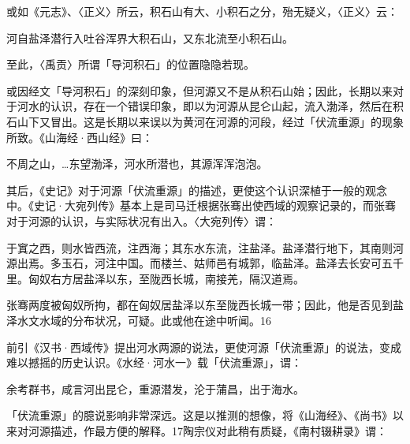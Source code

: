 或如《元志》、〈正义〉所云，积石山有大、小积石之分，殆无疑义，〈正义〉云：

\begin{BookQuote}
河自盐泽潜行入吐谷浑界大积石山，又东北流至小积石山。
\end{BookQuote}

至此，〈禹贡〉所谓「导河积石」的位置隐隐若现。

或因经文「导河积石」的深刻印象，但河源又不是从积石山始；因此，长期以来对于河水的认识，存在一个错误印象，即以为河源从昆仑山起，流入渤泽，然后在积石山下又冒出。这是长期以来误以为黄河在河源的河段，经过「伏流重源」的现象所致。《山海经·西山经》曰：

\begin{BookQuote}
不周之山，…东望渤泽，河水所潜也，其源浑浑泡泡。
\end{BookQuote}

其后，《史记》对于河源「伏流重源」的描述，更使这个认识深植于一般的观念中。《史记·大宛列传》基本上是司马迁根据张骞出使西域的观察记录的，而张骞对于河源的认识，与实际状况有出入。〈大宛列传〉谓：

\vfill
\begin{BookNotes}
\end{BookNotes}

\begin{BookQuote}
于窴之西，则水皆西流，注西海；其东水东流，注盐泽。盐泽潜行地下，其南则河源出焉。多玉石，河注中国。而楼兰、姑师邑有城郭，临盐泽。盐泽去长安可五千里。匈奴右方居盐泽以东，至陇西长城，南接羌，隔汉道焉。
\end{BookQuote}

张骞两度被匈奴所拘，都在匈奴居盐泽以东至陇西长城一带；因此，他是否见到盐泽水文水域的分布状况，可疑。此或他在途中听闻。16

前引《汉书·西域传》提出河水两源的说法，更使河源「伏流重源」的说法，变成难以撼摇的历史认识。《水经·河水一》载「伏流重源」，谓：

\begin{BookQuote}
余考群书，咸言河出昆仑，重源潜发，沦于蒲昌，出于海水。
\end{BookQuote}

「伏流重源」的臆说影响非常深远。这是以推测的想像，将《山海经》、《尚书》以来对河源描述，作最方便的解释。17陶宗仪对此稍有质疑，《南村辍耕录》谓：

